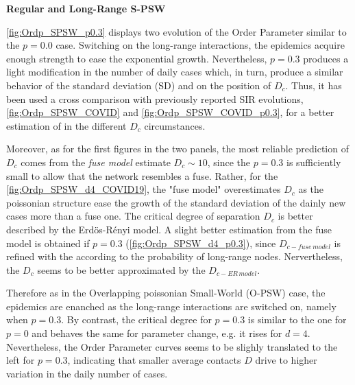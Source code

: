 \documentclass[a4paper,10pt,twoside]{book} %
\theoremstyle{definition}
\begin{document}
\textbf{Regular and Long-Range S-PSW}

\autoref{fig:Ordp_SPSW_p0.3} displays two evolution of the Order Parameter similar to the $p = 0.0$ case.
Switching on the long-range interactions, the epidemics acquire enough strength to ease the exponential growth. Nevertheless, $p = 0.3$ produces a light modification in the number of daily cases which, in turn, produce a similar behavior of the standard deviation (SD) and on the position of $ D_c$. Thus, it has been used a cross comparison with previously reported SIR evolutions, \autoref{fig:Ordp_SPSW_COVID} and \autoref{fig:Ordp_SPSW_COVID_p0.3}, for a better estimation of in the different $D_c$ circumstances.

Moreover, as for the first figures in the two panels, the most reliable prediction of $ D_c$ comes from the \textit{fuse model} estimate $ D_c \sim 10$, since the $ p=0.3$ is sufficiently small to allow that the network resembles a fuse.
Rather, for the \autoref{fig:Ordp_SPSW_d4_COVID19}, the "fuse model" overestimates $ D_c$ as the poissonian structure ease the growth of the standard deviation of the dainly new cases more than a fuse one. The critical degree of separation $ D_c$ is better described by the Erdös-Rényi model.
A slight better estimation from the fuse model is obtained if $ p = 0.3$ (\autoref{fig:Ordp_SPSW_d4_p0.3}), since $ D_{c-fuse \, model}$ is refined with the according to the probability of long-range nodes. Nervertheless, the $ D_c$ seems to be better approximated by the $D_{c-ER \, model}$.

Therefore as in the Overlapping poissonian Small-World (O-PSW) case, the epidemics are enanched as the long-range interactions are switched on, namely when $ p=0.3$. By contrast, the critical degree for $ p = 0.3$ is similar to the one for $ p=0$ and behaves the same for parameter change, e.g. it rises for $d = 4$. Nevertheless, the Order Parameter curves seems to be slighly translated to the left for $ p = 0.3$, indicating that smaller average contacts $D$  drive to higher variation in the daily number of cases.

\clearpage
\end{document}
